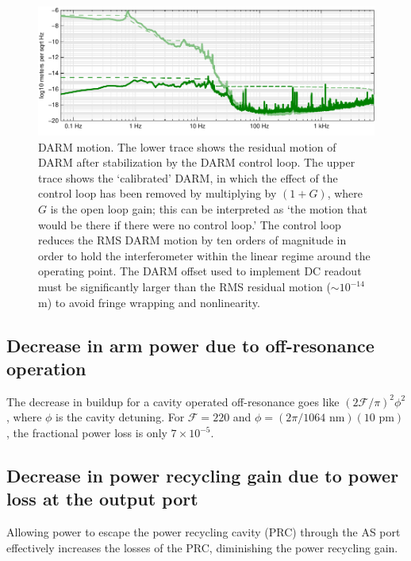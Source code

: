 \begin{figure}[p]
\centerline{\includegraphics[width=\columnwidth]{figures/residualDARM.pdf}}
\caption[Residual DARM motion]{\label{fig:residual-DARM}DARM
  motion. The lower trace shows the residual motion of DARM after
  stabilization by the DARM control loop.  The upper trace shows the
  `calibrated' DARM, in which the effect of the control loop has been
  removed by multiplying by $(1+G)$, where $G$ is the open loop gain;
  this can be interpreted as `the motion that would be there if there
  were no control loop.'  The control loop reduces the RMS DARM motion
  by ten orders of magnitude in order to hold the interferometer
  within the linear regime around the operating point.  The DARM
  offset used to implement DC readout must be significantly larger
  than the RMS residual motion ($\sim10^{-14}$ m) to avoid fringe
  wrapping and nonlinearity.}
\end{figure}

\subsection{Decrease in arm power due to off-resonance operation}

The decrease in buildup for a cavity operated off-resonance goes like
$(2\mathcal{F}/\pi)^2\phi^2$, where $\phi$ is the cavity detuning.
For $\mathcal{F}=220$ and $\phi=(2\pi/1064\text{ nm})(10\text{ pm})$,
the fractional power loss is only $7\times10^{-5}$.

\subsection{Decrease in power recycling gain due to power loss at the output port}

Allowing power to escape the power recycling cavity (PRC) through the
AS port effectively increases the losses of the PRC, diminishing the
power recycling gain.


